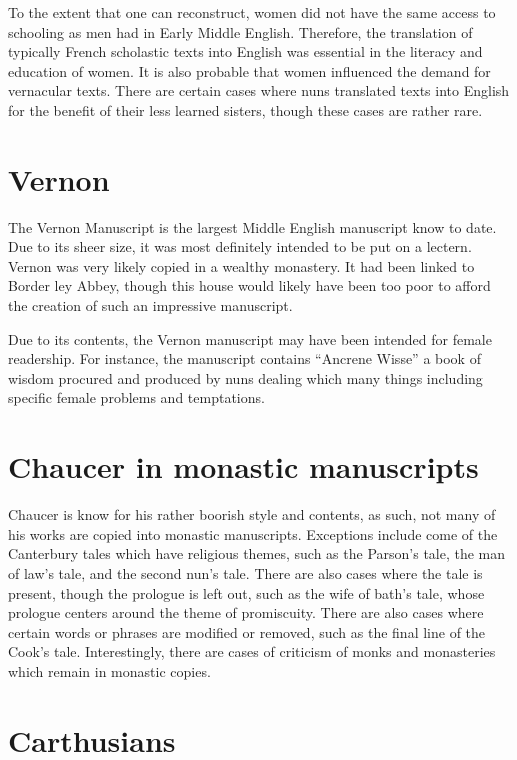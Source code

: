 \documentclass[12pt]{report}
\begin{document}
To the extent that one can reconstruct, women did not have the same access to schooling as men had in Early Middle English. Therefore, the translation of typically French scholastic texts into English was essential in the literacy and education of women. It is also probable that women influenced the demand for vernacular texts. There are certain cases where nuns translated texts into English for the benefit of their less learned sisters, though these cases are rather rare.

\section{Vernon}

The Vernon Manuscript is the largest Middle English manuscript know to date. Due to its sheer size, it was most definitely intended to be put on a lectern. Vernon was very likely copied in a wealthy monastery. It had been linked to Border ley Abbey, though this house would likely have been too poor to afford the creation of such an impressive manuscript.

Due to its contents, the Vernon manuscript may have been intended for female readership. For instance, the manuscript contains “Ancrene Wisse” a book of wisdom procured and produced by nuns dealing which many things including specific female problems and temptations.

\section{Chaucer in monastic manuscripts}

Chaucer is know for his rather boorish style and contents, as such, not many of his works are copied into monastic manuscripts. Exceptions include come of the Canterbury tales which have religious themes, such as the Parson’s tale, the man of law’s tale, and the second nun’s tale. There are also cases where the tale is present, though the prologue is left out, such as the wife of bath’s tale, whose prologue centers around the theme of promiscuity. There are also cases where certain words or phrases are modified or removed, such as the final line of the Cook’s tale. Interestingly, there are cases of criticism of monks and monasteries which remain in monastic copies.

\section{Carthusians}
\end{document}
